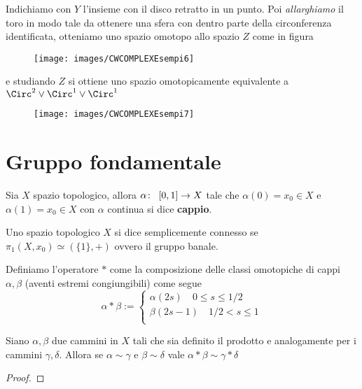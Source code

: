 \begin{remark}
\begin{enumerate}
			Indichiamo con $Y$ l'insieme con il disco retratto in un punto. Poi \textit{allarghiamo} il toro in modo tale da ottenere una sfera con dentro parte della circonferenza identificata, otteniamo uno spazio omotopo allo spazio $Z$ come in figura
			\begin{figure}[h!]
				\centering
				\texttt{[image: images/CWCOMPLEXEsempi6]}
				\caption{}
				\label{fig:cwcomplexesempi4}
			\end{figure}
			e studiando $Z$ si ottiene uno spazio omotopicamente equivalente a $\Circ^2 \lor \Circ^1 \lor \Circ^1$
			\begin{figure}[h!]
				\centering
				\texttt{[image: images/CWCOMPLEXEsempi7]}
				\caption{}
				\label{fig:cwcomplexesempi4}
			\end{figure}
			
	\end{enumerate}
\end{remark}

\section{Gruppo fondamentale}

\begin{definition}
	Sia $X$ spazio topologico, allora $\alpha \colon\ \left[0,1\right] \rightarrow X$ tale che $\alpha(0) = x_0 \in X$ e $\alpha(1) = x_0 \in X$ con $\alpha$ continua si dice \textbf{cappio}.
\end{definition}

\begin{definition}
	Uno spazio topologico $X$ si dice semplicemente connesso se $\pi_1(X, x_0) \simeq (\{1\}, +)$ ovvero il gruppo banale. 
 \end{definition}

\begin{definition}
	Definiamo l'operatore $*$ come la composizione delle classi omotopiche di cappi $\alpha, \beta$ (aventi estremi congiungibili) come segue
	\begin{equation}
	\alpha * \beta :=
	\begin{cases}
		\alpha(2s) \quad 0 \le s \le 1/2 \\
		\beta(2s - 1) \quad 1/2 < s \le 1 \\ 
	\end{cases}
	\end{equation}
\end{definition}

\begin{theorem}
	Siano $\alpha, \beta$ due cammini in $X$ tali che sia definito il prodotto e analogamente per i cammini $\gamma, \delta$. Allora se $\alpha \sim \gamma$ e $\beta \sim \delta$ vale $\alpha * \beta \sim \gamma * \delta$
\end{theorem}
\begin{proof}
\end{proof}

